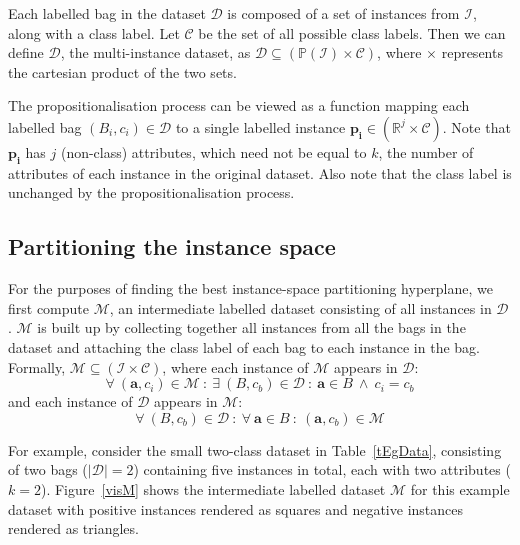 \documentclass[a4paper,12pt]{article} %
\newcommand{\real}{\mathbb{R}}
\newcommand{\mcl}[1]{\mathcal{#1}}
\newcommand{\power}{\mathbb{P}}
\newcommand{\vect}[1]{\boldsymbol{#1}}
\begin{document}
Each labelled bag in the dataset $\mcl{D}$ is 
    composed of a set of instances from $\mcl{I}$,
    along with a class label. %
Let $\mcl{C}$ be the set of all possible class labels.
Then we can define $\mcl{D}$,
    the multi-instance dataset, as 
    $\mcl{D} \subseteq ( \power (\mcl{I}) \times \mcl{C} )$,
    where $\times$ represents the cartesian product of the two sets.

The propositionalisation process can be viewed as a function
    mapping each labelled bag $({B_i},c_i) \in \mcl{D}$ to 
    a single labelled instance $\vect{p_i} \in ( \real^j \times \mcl{C} )$.
Note that $\vect{p_i}$ has $j$ (non-class) attributes, 
    which need not be equal to $k$, the number of attributes of 
    each instance in the original dataset.
Also note that the class label is unchanged by the propositionalisation process.
       

\subsection{Partitioning the instance space}

For the purposes of finding the best instance-space partitioning hyperplane,
    we first compute $\mcl{M}$, an intermediate labelled dataset 
    consisting of all instances in $\mcl{D}$.
$\mcl{M}$ is built up by collecting together all instances
    from all the bags in the dataset and 
    attaching the class label of each bag to 
    each instance in the bag.
Formally, $\mcl{M} \subseteq (\mcl{I} \times \mcl{C})$, 
    where each instance of $\mcl{M}$ appears in $\mcl{D}$:
    $$
        \forall~(\vect{a},c_i)\in\mcl{M} ~:~ 
            \exists~({B},c_b) \in \mcl{D} ~:~ 
                \vect{a} \in {B} ~\land~ c_i = c_b
    $$
    and each instance of $\mcl{D}$ appears in $\mcl{M}$:
    $$
        \forall~({B},c_b) \in \mcl{D} ~:~ 
            \forall~\vect{a} \in {B} ~:~
                (\vect{a},c_b) \in \mcl{M}
    $$    

For example, consider the small two-class dataset in Table~\ref{tEgData}, 
    consisting of two bags ($|\mcl{D}| = 2$)
    containing five instances in total, each with two attributes ($k=2$).
Figure~\ref{visM} shows the intermediate labelled dataset $\mcl{M}$ 
    for this example dataset with 
    positive instances rendered as squares and 
    negative instances rendered as triangles.
\end{document}
